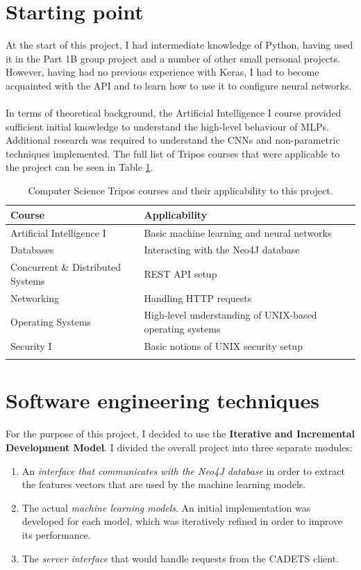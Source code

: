 	\section{Starting point} \label{Section 2.6}
	At the start of this project, I had intermediate knowledge of Python, having used it in the Part 1B group project and a number of other small personal projects. However, having had no previous experience with Keras, I had to become acquainted with the API and to learn how to use it to configure neural networks.   
	\\ \\
	In terms of theoretical background, the Artificial Intelligence I course provided sufficient initial knowledge to understand the high-level behaviour of MLPs. Additional research was required to understand the CNNs and non-parametric techniques implemented. The full list of Tripos courses that were applicable to the project can be seen in Table \ref{Table 2.4}.
	
	\begin{longtable}{|p{} | p{}|}
		\textbf{Course} & \textbf{Applicability} \\ 
		\hline
		Artificial Intelligence I & Basic machine learning and neural networks \\
		Databases & Interacting with the Neo4J database \\
		Concurrent \& Distributed Systems & REST API setup \\ 
		Networking & Handling HTTP requests \\
		Operating Systems & High-level understanding of UNIX-based operating systems\\
		Security I & Basic notions of UNIX security setup \\
		\hline
		\caption[Computer Science Tripos courses and their applicability to this project.]{\centering Computer Science Tripos courses and their applicability to this project.}
		\label{Table 2.4}
	\end{longtable}
	
	\section{Software engineering techniques} \label{Section 2.7}
	For the purpose of this project, I decided to use the \textbf{Iterative and Incremental Development Model}. I divided the overall project into three separate modules: 
	\begin{enumerate}
		\item An \textit{interface that communicates with the Neo4J database} in order to extract the features vectors that are used by the machine learning models.
		\item The actual \textit{machine learning models}. 	An initial implementation was developed for each model, which was iteratively refined in order to improve its performance.  
		\item The \textit{server interface} that would handle requests from the CADETS client.
	\end{enumerate}

